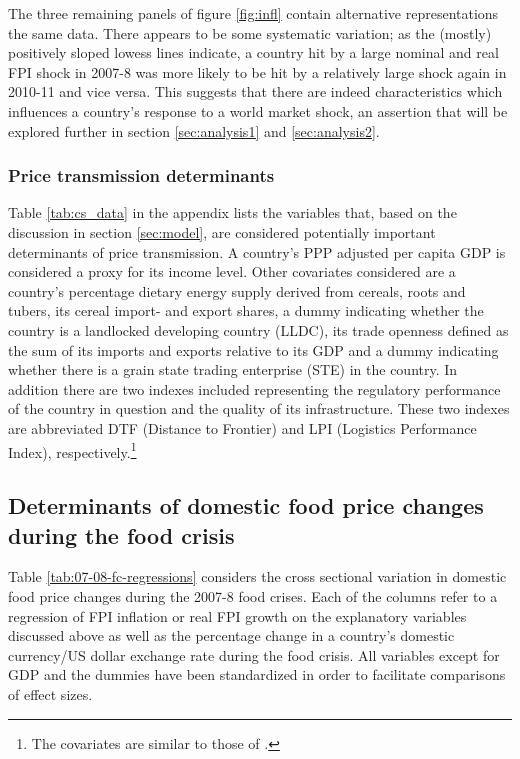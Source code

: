 \documentclass[12pt,english]{article}
\begin{document}
The three remaining panels of figure \ref{fig:infl} contain alternative representations the same data. There appears to be some systematic variation; as the (mostly) positively sloped lowess lines indicate, a country hit by a large nominal and real FPI shock in 2007-8 was more likely to be hit by a relatively large shock again in 2010-11 and vice versa. This suggests that there are indeed characteristics which influences a country's response to a world market shock, an assertion that will be explored further in section \ref{sec:analysis1} and \ref{sec:analysis2}.

\subsubsection{Price transmission determinants}
Table \ref{tab:cs_data} in the appendix lists the variables that, based on the discussion in section \ref{sec:model}, are considered potentially important determinants of price transmission. A country's PPP adjusted per capita GDP is considered a proxy for its income level. Other covariates considered are a country's percentage dietary energy supply derived from cereals, roots and tubers, its cereal import- and export shares, a dummy indicating whether the country is a landlocked developing country (LLDC), its trade openness defined as the sum of its imports and exports relative to its GDP and a dummy indicating whether there is a grain state trading enterprise (STE) in the country. In addition there are two indexes included representing the regulatory performance of the country in question and the quality of its infrastructure. These two indexes are abbreviated DTF (Distance to Frontier) and LPI (Logistics Performance Index), respectively.\footnote{The covariates are similar to those of \citet{greb12}.}  

\subsection{Determinants of domestic food price changes during the food crisis\label{sec:analysis1}}
Table \ref{tab:07-08-fc-regressions} considers the cross sectional variation in domestic food price changes during the 2007-8 food crises. Each of the columns refer to a regression of FPI inflation or real FPI growth on the explanatory variables discussed above as well as the percentage change in a country's domestic currency/US dollar exchange rate during the food crisis. All variables except for GDP and the dummies have been standardized in order to facilitate comparisons of effect sizes. 
\end{document}
